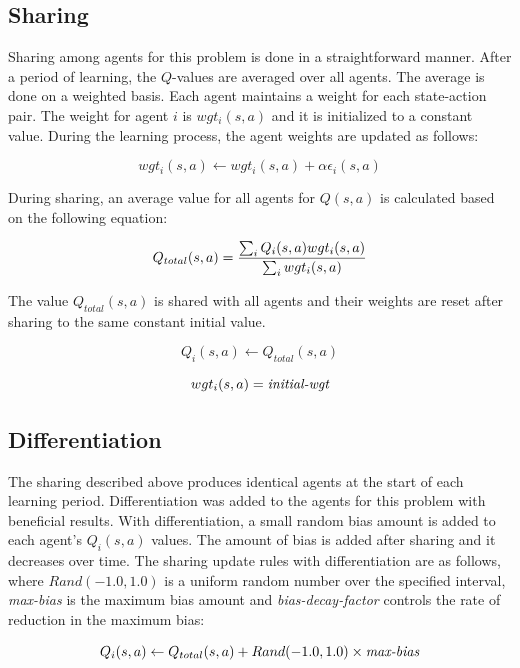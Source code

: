 \begin{flushleft}
\subsection{Sharing}
Sharing among agents for this problem is done in a straightforward manner.  After a period of learning, the $Q$-values are averaged over all agents.  The average is done on a weighted basis.  Each agent maintains a weight for each state-action pair.  The weight for agent $i$ is $wgt_i(s,a)$ and it is initialized to a constant value.  During the learning process, the agent weights are updated as follows:

\begin{equation}
wgt_i(s,a) \gets wgt_i(s,a)+\alpha\epsilon_i(s,a)
\end{equation}

During sharing, an average value for all agents for $Q(s,a)$ is calculated based on the following equation:

\begin{equation}
Q_{total}(s,a)={ {\sum_iQ_i(s,a)wgt_i(s,a)} \over {\sum_iwgt_i(s,a)} }
\end{equation}

The value $Q_{total}(s,a)$ is shared with all agents and their weights are reset after sharing to the same constant initial value. 

\begin{equation}
Q_i(s,a) \gets Q_{total}(s,a)
\end{equation}

\begin{equation}
wgt_i(s,a) = \mbox{\it initial-wgt}
\end{equation}

\subsection{Differentiation}
The sharing described above produces identical agents at the start of each learning period.  Differentiation was added to the agents for this problem with beneficial results.  With differentiation, a small random bias amount is added to each agent’s $Q_i(s,a)$ values.  The amount of bias is added after sharing and it decreases over time.  The sharing update rules with differentiation are as follows, where $Rand(-1.0,1.0)$ is a uniform random number over the specified interval, {\it max-bias} is the maximum bias amount and {\it bias-decay-factor} controls the rate of reduction in the maximum bias:

\begin{equation}
Q_i(s,a) \gets Q_{total}(s,a) + Rand(-1.0,1.0) \times \mbox{\it max-bias}
\end{equation}


\end{flushleft}
